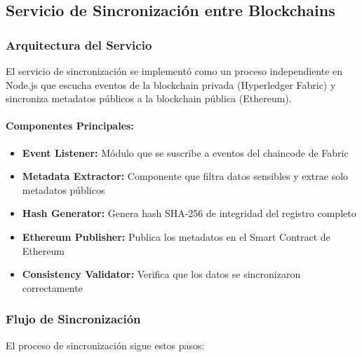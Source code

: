 \subsection{Servicio de Sincronización entre Blockchains}

\subsubsection{Arquitectura del Servicio}

El servicio de sincronización se implementó como un proceso independiente en Node.js que escucha eventos de la blockchain privada (Hyperledger Fabric) y sincroniza metadatos públicos a la blockchain pública (Ethereum).

\paragraph{Componentes Principales:}
\begin{itemize}
    \item \textbf{Event Listener:} Módulo que se suscribe a eventos del chaincode de Fabric
    \item \textbf{Metadata Extractor:} Componente que filtra datos sensibles y extrae solo metadatos públicos
    \item \textbf{Hash Generator:} Genera hash SHA-256 de integridad del registro completo
    \item \textbf{Ethereum Publisher:} Publica los metadatos en el Smart Contract de Ethereum
    \item \textbf{Consistency Validator:} Verifica que los datos se sincronizaron correctamente
\end{itemize}

\subsubsection{Flujo de Sincronización}

El proceso de sincronización sigue estos pasos:

